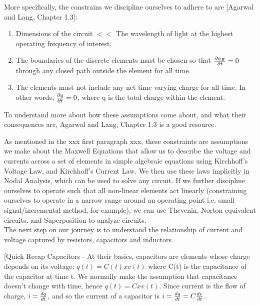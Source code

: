 \documentclass{report}
\begin{document}

More specifically, the constrains we discipline ourselves to adhere to are [Agarwal and Lang, Chapter 1.3]:
\begin{enumerate}
    \item Dimensions of the circuit $<<$ The wavelength of light at the highest operating frequency of interest. 
    \item The boundaries of the discrete elements must be chosen so that
        $\pdv{\phi_{B}}{t} = 0$ through any closed path outside the element for all time.
    \item The elements must not include any net time-varying charge for all time. In other words, $\pdv{q}{t} = 0$, where q is the total charge within the element.
\end{enumerate}

To understand more about how these assumptions come about, and what their consequences are, Agarwal and Lang, Chapter 1.3 is a good resource.

As mentioned in the xxx first paragraph xxx, these constraints are assumptions we make about the Maxwell Equations that allow us to describe the voltage and currents across a set of elements in simple algebraic equations using Kirchhoff's Voltage Law, and Kirchhoff's Current Law. We then use these laws implicitly in Nodal Analysis, which can be used to solve any circuit. If we further discipline ourselves to operate such that all non-linear elements act linearly (constraining ourselves to operate in a narrow range around an operating point i.e. small signal/incremental method, for example), we can use Thevenin, Norton equivalent circuits, and Superposition to analyze circuits.\smallskip \\
The next step on our journey is to understand the relationship of current and voltage captured by resistors, capacitors and inductors. 

[Quick Recap
Capacitors -
At their basics, capacitors are elements whose charge depends on its voltage: $q(t) = C(t) x v(t)$ where C(t) is the capacitance of the capacitor at time t. We normally make the assumption that capacitance doesn't change with time, hence $q(t) = C x v(t)$. 
Since current is the flow of charge, $i = \dv{q}{t}$, and so the current of a capacitor is $i = \dv{q}{t} = C \dv{v}{t}$.
\end{document}
